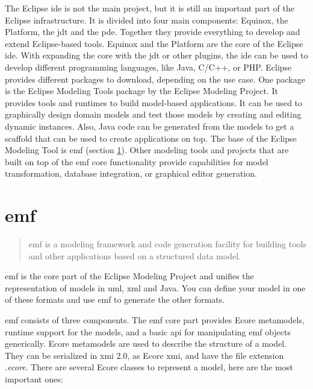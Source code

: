   The Eclipse \ac{ide} is not the main project, but it is still an important part of the Eclipse infrastructure. It is divided into four main components: Equinox, the Platform, the \ac{jdt} and the \ac{pde}. Together they provide everything to develop and extend Eclipse-based tools. Equinox and the Platform are the core of the Eclipse \ac{ide}. With expanding the core with the \ac{jdt} or other plugins, the \ac{ide} can be used to develop different programming languages, like Java, C/C++, or PHP. \cite{emf} Eclipse provides different packages to download, depending on the use case. One package is the Eclipse Modeling Tools package by the Eclipse Modeling Project. It provides tools and runtimes to build model-based applications. It can be used to graphically design domain models and test those models by creating and editing dynamic instances. Also, Java code can be generated from the models to get a scaffold that can be used to create applications on top. \cite{eclipse_modeling} The base of the Eclipse Modeling Tool is \ac{emf} (section \ref{subsec:emf}). Other modeling tools and projects that are built on top of the \ac{emf} core functionality provide capabilities for model transformation, database integration, or graphical editor generation. \cite{emf}

  \section{\acf{emf}}
    \label{subsec:emf}

    \begin{quote}
      \glqq\acf{emf} is a modeling framework and code generation facility for building tools and other applications based on a structured data model.\grqq{} \autocite{emf-repo}
    \end{quote}

    \acf{emf} is the core part of the Eclipse Modeling Project and unifies the representation of models in \acs{uml}, \acs{xml} and Java. You can define your model in one of these formats and use \ac{emf} to generate the other formats.
    
    \ac{emf} consists of three components. The \ac{emf} core part provides Ecore metamodels, runtime support for the models, and a basic \acs{api} for manipulating \ac{emf} objects generically. Ecore metamodels are used to describe the structure of a model. \cite{eclipse_emf} They can be serialized in \ac{xmi} 2.0, as Ecore \ac{xmi}, and have the file extension \textit{.ecore}. There are several Ecore classes to represent a model, here are the most important ones:


